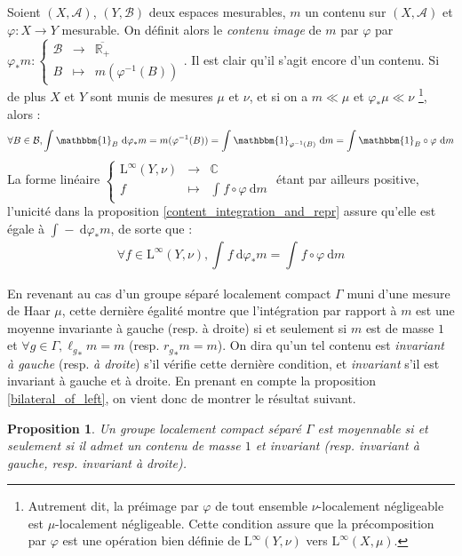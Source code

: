 \documentclass[a4paper,12pt]{article}
\newtheorem{proposition}[theorem]{Proposition}
\newcommand{\R}{\mathbb{R}}
\newcommand{\C}{\mathbb{C}}
\newcommand{\indic}{\mathbbm{1}}
\newcommand{\integral}[4]{\int_{#1}^{#2} #3~\mathrm{d}#4}
\newcommand\fundef[3]{#1: \left\{\begin{array}{ccc}#2\\#3\end{array}\right.}
\newcommand\funlam[2]{\left\{\begin{array}{ccc}#1\\#2\end{array}\right.}
\newcommand{\ssi}{si et seulement si }
\newcommand{\closure}[1]{\overline{#1}}
\newcommand{\inv}{^{-1}}
\newcommand{\comp}{\circ}
\newcommand{\blank}{{-}}
\begin{document}
Soient $(X, \mathcal{A})$, $(Y, \mathcal{B})$ deux espaces mesurables, $m$ un contenu sur $(X, \mathcal{A})$ et $\varphi : X\to Y$ mesurable.
On définit alors le \emph{contenu image} de $m$ par $\varphi$ par $\fundef{\varphi_* m}{\mathcal{B}&\to&\closure{\R_+}}{B&\mapsto&m(\varphi\inv(B))}$.
Il est clair qu'il s'agit encore d'un contenu. Si de plus $X$ et $Y$ sont munis de mesures $\mu$ et $\nu$, et si on a 
$m\ll\mu$ et $\varphi_*\mu\ll\nu$
\footnote{Autrement dit, la préimage par $\varphi$ de tout ensemble $\nu$-localement négligeable est $\mu$-localement négligeable. Cette condition assure que la précomposition 
par $\varphi$ est une opération bien définie de $\mathrm{L}^\infty(Y, \nu)$ vers $\mathrm{L}^\infty(X, \mu)$. }, alors :
\begin{equation*}
    \forall B\in\mathcal{B}, \integral{}{}{\indic_B}{\varphi_*m} = m(\varphi\inv(B)) = \integral{}{}{\indic_{\varphi\inv(B)}}{m} = \integral{}{}{\indic_B\comp\varphi}{m}
\end{equation*}
La forme linéaire $\funlam{\mathrm{L}^\infty(Y, \nu)&\to&\C}{f&\mapsto&\integral{}{}{f\comp\varphi}{m}}$ étant par ailleurs positive, l'unicité dans la proposition
\ref{content_integration_and_repr} assure qu'elle est égale à $\integral{}{}{\blank}{\varphi_*m}$, de sorte que :
\begin{equation*}
    \forall f\in\mathrm{L}^\infty(Y, \nu), \integral{}{}{f}{\varphi_*m} = \integral{}{}{f\comp\varphi}{m}
\end{equation*}

En revenant au cas d'un groupe séparé localement compact $\Gamma$ muni d'une mesure de Haar $\mu$, 
cette dernière égalité montre que l'intégration par rapport à $m$ est une moyenne invariante à gauche (resp. à droite) \ssi 
$m$ est de masse $1$ et $\forall g\in\Gamma, {\ell_g}_*m = m$ (resp. ${r_g}_*m = m$). On dira qu'un tel 
contenu est \emph{invariant à gauche} (resp. \emph{à droite}) s'il vérifie cette dernière condition, et 
\emph{invariant} s'il est invariant à gauche et à droite. En prenant en compte la proposition \ref{bilateral_of_left},
on vient donc de montrer le résultat suivant.
\begin{proposition}
    Un groupe localement compact séparé $\Gamma$ est moyennable \ssi il admet un contenu de masse $1$ et invariant 
    (resp. invariant à gauche, resp. invariant à droite).
\end{proposition}
\end{document}
